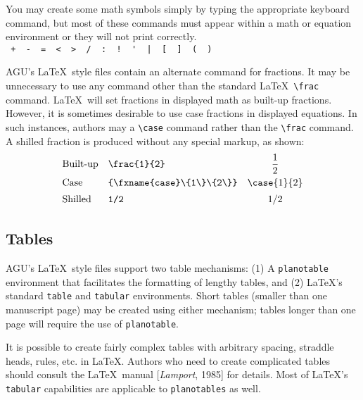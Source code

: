 \begin{article}

You may create some math symbols simply by typing the 
appropriate keyboard command, but most of these commands 
must appear within a math or equation environment or they 
will not print correctly.\\
\verb" +  -  =  <  >  /  :  !  '  |  [  ]  (  )"




AGU's \LaTeX\ style files contain an alternate command 
for fractions.  It may be unnecessary to use any command 
other than the standard \LaTeX\ \verb"\frac" command.
\LaTeX\ will set fractions in displayed math as built-up 
fractions.  However, it is sometimes desirable to use 
case fractions in displayed equations.  In such instances, 
authors may a \verb"\case" command rather than the 
\verb"\frac" command.  A shilled fraction is produced 
without any special markup, as shown:
\vspace{-4pt}
\begin{displaymath}
\renewcommand{\arraystretch}{1.4}
\begin{array}{llc}
\mbox{Built-up}    & 
\verb"\frac{1}{2}" & 
\displaystyle\frac{1}{2}\\[.5ex]
\mbox{Case}        & 
\verb"\case{1}{2}" & 
\case{1}{2} \\
\mbox{Shilled}     & 
\verb"1/2"         & 
1/2 \\
\end{array}
\end{displaymath}
\vspace{-10pt}

\subsection{Tables}

AGU's \LaTeX\ style files support two table mechanisms:
(1) A {\tt planotable} environment that facilitates the 
formatting of lengthy tables, and (2) \LaTeX's 
standard {\tt table} and {\tt tabular} environments.
Short tables (smaller than one manuscript page) may 
be created using either mechanism; tables longer than 
one page will require the use of {\tt planotable}.

It is possible to create fairly complex tables with 
arbitrary spacing, straddle heads, rules, etc. in \LaTeX.
Authors who need to create complicated tables should 
consult the \LaTeX\ manual [{\it Lamport}, 1985] for 
details.  Most of \LaTeX's {\tt tabular} capabilities 
are applicable to {\tt planotables} as well.



\end{article}
